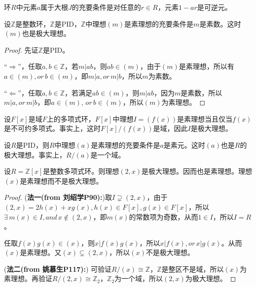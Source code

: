 \begin{theorem}
	环$R$中元素$a$属于大根$J$的充要条件是对任意的$r\in R$，元素$1-ar$是可逆元。
\end{theorem}

\begin{example}
	设$\mathbb{Z}$是整数环，$\mathbb{Z}$是PID，$\mathbb{Z}$中理想$(m)$是素理想的充要条件是$m$是素数。这时$(m)$也是极大理想。
\end{example}
\begin{proof}
	先证$\mathbb{Z}$是PID。
	\par
	“$\Rightarrow$”，任取$a,b\in \mathbb{Z}$，若$m\big| ab$，则$ab\in (m)$，由于$(m)$是素理想，所以有$a\in (m),or\, b\in (m)$，即$m\big| a,or\, m\big| b$，所以$m$为素数。
	\par
	“$\Leftarrow$”，任取$a,b\in \mathbb{Z}$，若满足$ab\in (m)$，则$m\big| ab$，因为$m$是素数，所以$m\big| a,or\, m\big| b$，即$a\in (m),\, or\, b\in (m)$，所以$(m)$为素理想。
\end{proof}

\begin{example}
	设$F[x]$是域$F$上的多项式环，$F[x]$中理想$I=(f(x))$是素理想当且仅当$f(x)$是不可约多项式。事实上，这时$F[x]/(f(x))$是域，因此$I$是极大理想。
\end{example}

\begin{example}
	设$R$是PID，则$R$中理想$(a)$是素理想的充要条件是$a$是素元。这时$(a)$也是$R$的极大理想。事实上，$R/(a)$是一个域。
\end{example}

\begin{example}
	设$R=\mathbb{Z}[x]$是整数多项式环。则理想$(2,x)$是极大理想。因而也是素理想。理想$(x)$是素理想而不是极大理想。
\end{example}

\begin{proof}
	(\textbf{法一(from 刘绍学P90):})取$I\supsetneq (2,x)$，由于$(2,x)=2h(x)+xg(x),h(x)\in F[x],g(x)\in F[x]$，所以$\exists \, m(x)\in I,and\, x\not\in (2,x)$，即$m(x)$的常数项为奇数，从而$1\in I$，所以$I=R$。
	\par
	任取$f(x)g(x)\in (x)$，则$x\big| f(x)g(x)$，所以$x\big| f(x),or\, x\big| g(x)$。从而$(x)$是素理想。又$(x)\subsetneq (2,x)$，所以$(x)$不是极大理想。
	\par
	(\textbf{法二(from 姚慕生P117):})
	可验证$R/(x)\cong\mathbb{Z}$，$\mathbb{Z}$是整区不是域，所以$(x)$为素理想。再验证$R/(2,x)\cong \mathbb{Z}_{2}$，$\mathbb{Z}_{2}$为一个域，所以$(2,x)$为极大理想。
\end{proof}

